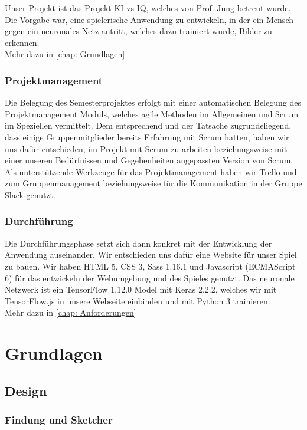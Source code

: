 \documentclass[11pt]{article}
\begin{document}
Unser Projekt ist das Projekt KI vs IQ, welches von Prof. Jung betreut wurde.
Die Vorgabe war, eine spielerische Anwendung zu entwickeln, in der ein Mensch gegen ein neuronales Netz antritt, welches dazu trainiert wurde, Bilder zu erkennen.\\
Mehr dazu in \autoref{chap: Grundlagen}
	
\subsubsection{  Projektmanagement }
\label{chap: Projektmanagement}
Die Belegung des Semesterprojektes erfolgt mit einer automatischen Belegung des Projektmanagement Moduls, welches agile Methoden im Allgemeinen und Scrum im Speziellen vermittelt. Dem entsprechend und der Tatsache zugrundeliegend, dass einige Gruppenmitglieder bereits Erfahrung mit Scrum hatten, haben wir uns dafür entschieden, im Projekt mit Scrum zu arbeiten beziehungsweise mit einer unseren Bedürfnissen und Gegebenheiten angepassten Version von Scrum.\\
Als unterstützende Werkzeuge für das Projektmanagement haben wir Trello und zum Gruppenmanagement beziehungsweise für die Kommunikation in der Gruppe Slack genutzt.

\subsubsection{ Durchführung }
\label{chap: durchfuhrung}
Die Durchführungsphase setzt sich dann konkret mit der Entwicklung der Anwendung auseinander. Wir entschieden uns dafür eine Website für unser Spiel zu bauen. Wir haben HTML 5, CSS 3, Sass 1.16.1 und Javascript (ECMAScript 6) für das entwickeln der Webumgebung und des Spieles genutzt. Das neuronale Netzwerk ist ein TensorFlow 1.12.0 Model mit Keras 2.2.2, welches wir mit TensorFlow.js in unsere Webseite einbinden und mit Python 3 trainieren.\\
Mehr dazu in \autoref{chap: Anforderungen}

\section{Grundlagen}
\label{chap: Grundlagen}
\subsection{Design}
\subsubsection{Findung und Sketcher}
\end{document}
